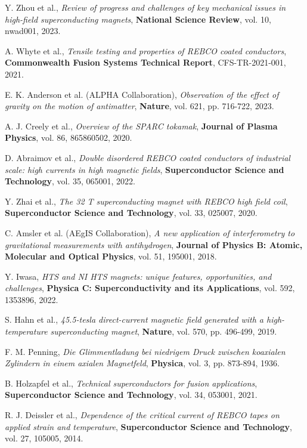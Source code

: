 \documentclass[12pt,a4paper]{article}
\begin{document}

\begin{thebibliography}{15}

Y. Zhou et al.,
\emph{Review of progress and challenges of key mechanical issues in high-field superconducting magnets},
\textbf{National Science Review}, vol. 10, nwad001, 2023.

A. Whyte et al.,
\emph{Tensile testing and properties of REBCO coated conductors},
\textbf{Commonwealth Fusion Systems Technical Report}, CFS-TR-2021-001, 2021.

E. K. Anderson et al. (ALPHA Collaboration),
\emph{Observation of the effect of gravity on the motion of antimatter},
\textbf{Nature}, vol. 621, pp. 716-722, 2023.

A. J. Creely et al.,
\emph{Overview of the SPARC tokamak},
\textbf{Journal of Plasma Physics}, vol. 86, 865860502, 2020.

D. Abraimov et al.,
\emph{Double disordered REBCO coated conductors of industrial scale: high currents in high magnetic fields},
\textbf{Superconductor Science and Technology}, vol. 35, 065001, 2022.

Y. Zhai et al.,
\emph{The 32 T superconducting magnet with REBCO high field coil},
\textbf{Superconductor Science and Technology}, vol. 33, 025007, 2020.

C. Amsler et al. (AEgIS Collaboration),
\emph{A new application of interferometry to gravitational measurements with antihydrogen},
\textbf{Journal of Physics B: Atomic, Molecular and Optical Physics}, vol. 51, 195001, 2018.

Y. Iwasa,
\emph{HTS and NI HTS magnets: unique features, opportunities, and challenges},
\textbf{Physica C: Superconductivity and its Applications}, vol. 592, 1353896, 2022.

S. Hahn et al.,
\emph{45.5-tesla direct-current magnetic field generated with a high-temperature superconducting magnet},
\textbf{Nature}, vol. 570, pp. 496-499, 2019.

F. M. Penning,
\emph{Die Glimmentladung bei niedrigem Druck zwischen koaxialen Zylindern in einem axialen Magnetfeld},
\textbf{Physica}, vol. 3, pp. 873-894, 1936.

B. Holzapfel et al.,
\emph{Technical superconductors for fusion applications},
\textbf{Superconductor Science and Technology}, vol. 34, 053001, 2021.

R. J. Deissler et al.,
\emph{Dependence of the critical current of REBCO tapes on applied strain and temperature},
\textbf{Superconductor Science and Technology}, vol. 27, 105005, 2014.

\end{thebibliography}
\end{document}
